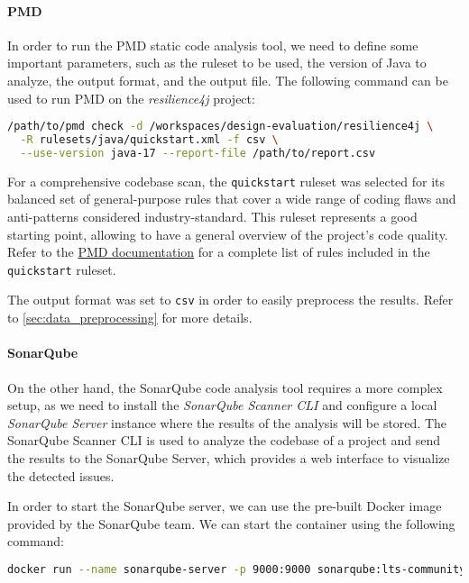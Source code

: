 \paragraph{PMD}
\label{sec:pmd_usage}

In order to run the PMD static code analysis tool, we need to define some important parameters, such as the ruleset to be used, the version of Java to analyze, the output format, and the output file. The following command can be used to run PMD on the \textit{resilience4j} project:

\begin{lstlisting}[language=bash, caption={Command to run PDM static code analysis}]
/path/to/pmd check -d /workspaces/design-evaluation/resilience4j \
  -R rulesets/java/quickstart.xml -f csv \
  --use-version java-17 --report-file /path/to/report.csv
\end{lstlisting}

\noindent For a comprehensive codebase scan, the \texttt{quickstart} ruleset was selected for its balanced set of general-purpose rules that cover a wide range of coding flaws and anti-patterns considered industry-standard. This ruleset represents a good starting point, allowing to have a general overview of the project's code quality. Refer to the \href{https://pmd.github.io/pmd/pmd_rules_java.html#additional-rulesets}{PMD documentation} for a complete list of rules included in the \texttt{quickstart} ruleset.

The output format was set to \texttt{csv} in order to easily preprocess the results. Refer to \autoref{sec:data_preprocessing} for more details.

\paragraph{SonarQube}

On the other hand, the SonarQube code analysis tool requires a more complex setup, as we need to install the \textit{SonarQube Scanner CLI} and configure a local \textit{SonarQube Server} instance where the results of the analysis will be stored. The SonarQube Scanner CLI is used to analyze the codebase of a project and send the results to the SonarQube Server, which provides a web interface to visualize the detected issues.

In order to start the SonarQube server, we can use the pre-built Docker image provided by the SonarQube team. We can start the container using the following command:

\begin{lstlisting}[language=bash, caption={Starting the SonarQube server}]
docker run --name sonarqube-server -p 9000:9000 sonarqube:lts-community
\end{lstlisting}


